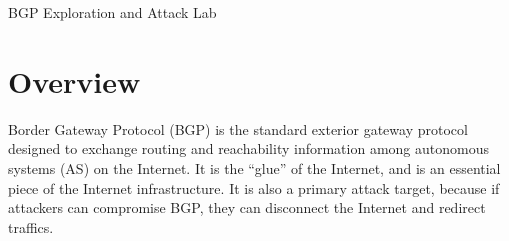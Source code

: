 
\newcommand{\commonfolder}{../../common-files}





\newcommand{\bgpFigs}{./Figs}

\newcommand{\bgpintro}{1\xspace}
\newcommand{\bgpprotocol}{3\xspace}
\newcommand{\bgpupdate}{7\xspace}
\newcommand{\pathselection}{8\xspace}
\newcommand{\bigcommunity}{9\xspace}
\newcommand{\transitas}{10\xspace}
\newcommand{\ipanycast}{11\xspace}
\newcommand{\bgphijacking}{12\xspace}


\usepackage{hyperref}




\begin{center}
{\LARGE BGP Exploration and Attack Lab}
\end{center}






\section{Overview}

Border Gateway Protocol (BGP) is the standard exterior gateway protocol
designed to exchange routing and reachability information among autonomous
systems (AS) on the Internet. It is the ``glue'' of the Internet,
and is an essential piece of the Internet infrastructure. It is 
also a primary attack target, because if attackers can 
compromise BGP, they can disconnect the Internet and redirect traffics. 

